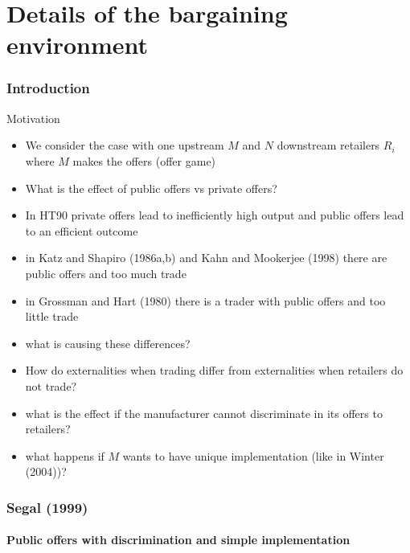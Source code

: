 \documentclass[11pt,english]{beamer}
\begin{document}
\part[lecture 6]{Details of the bargaining environment}

\section{Introduction}

\begin{frame}[allowframebreaks]{Motivation}
  \begin{itemize}
  \item We consider the case with one upstream $M$ and $N$ downstream
    retailers $R_i$ where $M$ makes the offers (offer game)
  \item What is the effect of public offers vs private offers?
  \item In HT90 private offers lead to inefficiently high output and
    public offers lead to an efficient outcome
  \item in Katz and Shapiro (1986a,b) and Kahn and Mookerjee (1998)
    there are public offers and too much trade
  \item in Grossman and Hart (1980) there is a trader with public
    offers and too little trade
  \item what is causing these differences?
  \item How do externalities when trading differ from externalities
    when retailers do not trade?
  \item what is the effect if the manufacturer cannot discriminate in
    its offers to retailers?
  \item what happens if $M$ wants to have unique implementation (like
    in Winter (2004))?
  \end{itemize}
\end{frame}

\section{Segal (1999)}

\subsection{Public offers with discrimination and simple
  implementation}
\end{document}

